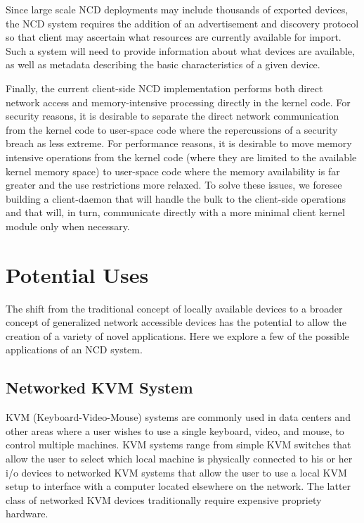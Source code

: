 \documentclass[11pt,twocolumn]{article}
\begin{document}
Since large scale NCD deployments may include thousands of exported
devices, the NCD system requires the addition of an advertisement and
discovery protocol so that client may ascertain what resources are
currently available for import. Such a system will need to provide
information about what devices are available, as well as metadata
describing the basic characteristics of a given device.

Finally, the current client-side NCD implementation performs both direct
network access and memory-intensive processing directly in the kernel
code. For security reasons, it is desirable to separate the direct
network communication from the kernel code to user-space code where
the repercussions of a security breach as less extreme.
For performance reasons, it is desirable to move memory
intensive operations from the kernel code (where they are limited to
the available kernel memory space) to user-space code where the memory
availability is far greater and the use restrictions more relaxed. To
solve these issues, we
foresee building a client-daemon that will handle the bulk to the
client-side operations and that will, in turn, communicate directly with
a more minimal client kernel module only when necessary. 

\section{Potential Uses}
\label{sec:potentialuses}

The shift from the traditional concept of locally available devices to a
broader concept of generalized network accessible devices has the
potential to allow the creation of a variety of novel
applications. Here we explore a few of the possible applications of an
NCD system.

\subsection{Networked KVM System}
\label{sec:networkedkvm}

KVM (Keyboard-Video-Mouse) systems are commonly used in data centers
and other areas where a user wishes to use a single keyboard, video,
and mouse, to control multiple machines. KVM systems range from simple KVM
switches that allow the user to select which local machine is
physically connected to his or her i/o devices to
networked KVM systems that allow the user to use a
local KVM setup to interface with a computer located elsewhere on the
network. The latter class of networked KVM devices traditionally require
expensive propriety hardware.
\end{document}
